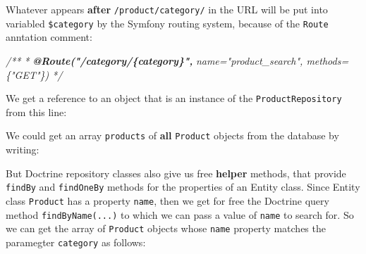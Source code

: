 \documentclass[a4paperpaper,openright]{book}
\newenvironment{Shaded}{}{}
\newcommand{\AnnotationTok}[1]{\textcolor[rgb]{0.38,0.63,0.69}{\textbf{\textit{#1}}}}
\newcommand{\CommentTok}[1]{\textcolor[rgb]{0.38,0.63,0.69}{\textit{#1}}}
\newcommand{\KeywordTok}[1]{\textcolor[rgb]{0.00,0.44,0.13}{\textbf{#1}}}
\newcommand{\NormalTok}[1]{#1}
\newcommand{\OtherTok}[1]{\textcolor[rgb]{0.00,0.44,0.13}{#1}}
\newcommand{\StringTok}[1]{\textcolor[rgb]{0.25,0.44,0.63}{#1}}
\begin{document}
Whatever appears \textbf{after} \texttt{/product/category/} in the URL
will be put into variabled \texttt{\$category} by the Symfony routing
system, because of the \texttt{Route} anntation comment:

\begin{Shaded}
\begin{Highlighting}[]
    \CommentTok{/**}
\CommentTok{     * }\AnnotationTok{@Route("/category/\{category\}",}\CommentTok{ name="product_search", methods=\{"GET"\})}
\CommentTok{     */}
\end{Highlighting}
\end{Shaded}

We get a reference to an object that is an instance of the
\texttt{ProductRepository} from this line:

\begin{Shaded}
\end{Shaded}

We could get an array \texttt{products} of \textbf{all} \texttt{Product}
objects from the database by writing:

\begin{Shaded}
\end{Shaded}

But Doctrine repository classes also give us free \textbf{helper}
methods, that provide \texttt{findBy} and \texttt{findOneBy} methods for
the properties of an Entity class. Since Entity class \texttt{Product}
has a property \texttt{name}, then we get for free the Doctrine query
method \texttt{findByName(...)} to which we can pass a value of
\texttt{name} to search for. So we can get the array of \texttt{Product}
objects whose \texttt{name} property matches the paramegter
\texttt{category} as follows:

\begin{Shaded}
\end{Shaded}
\end{document}
